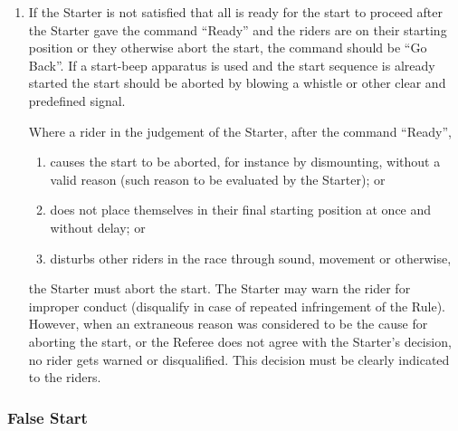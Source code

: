\begin{enumerate}[leftmargin=1.5em,labelsep=*]
	\item If the Starter is not satisfied that all is ready for the start to proceed after the Starter gave the command 
  ``Ready'' and the riders are on their starting position or they otherwise abort the start, the command should be ``Go Back''.
	If a start-beep apparatus is used and the start sequence is already started the start should be 
  aborted by blowing a whistle or other clear and predefined signal.
	
	Where a rider in the judgement of the Starter, after the command ``Ready'',
	\begin{enumerate}[label*=\arabic*,leftmargin=1.5em,labelsep=*]
		\item causes the start to be aborted, for instance by dismounting, without a valid reason 
    (such reason to be evaluated by the Starter); or
		
		\item does not place themselves in their final starting position at once and without delay; or
		
		\item disturbs other riders in the race through sound, movement or otherwise,
	\end{enumerate}
	the Starter must abort the start.
	The Starter may warn the rider for improper conduct (disqualify in case of repeated infringement of the Rule).
	However, when an extraneous reason was considered to be the cause for aborting the start, 
  or the Referee does not agree with the Starter's decision, no rider gets warned or disqualified. 
  This decision must be clearly indicated to the riders.
\end{enumerate}

\subsubsection{False Start \label{subsubsec:track_racing_false-starts}}

